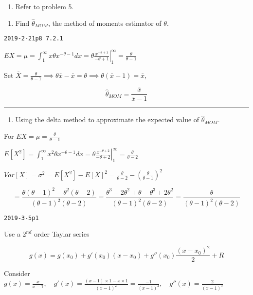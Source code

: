 \documentclass[12pt,]{article}
\providecommand{\tightlist}{%
  \setlength{\itemsep}{0pt}\setlength{\parskip}{0pt}}
\begin{document}
\begin{enumerate}
\def\labelenumi{\arabic{enumi}.}
\setcounter{enumi}{5}
\tightlist
\item
  \textcolor[rgb]{0.5,0.5,0.5}{Refer to problem 5.}
\end{enumerate}

\begin{enumerate}
\def\labelenumi{\alph{enumi}.}
\tightlist
\item
  \textcolor[rgb]{0.5,0.5,0.5}{Find $\hat\theta_{MOM}$, the method of moments estimator of $\theta$.}
\end{enumerate}

\texttt{2019-2-21p8\ 7.2.1}

\(EX=\mu=\int_1^{\infty}x\theta x^{-\theta-1}dx=\left.\theta\frac{x^{-\theta+1}}{-\theta+1}\right|_1^{\infty}=\frac\theta{\theta-1}\)

Set
\(\bar X=\frac\theta{\theta-1}\implies\theta\bar x-\bar x=\theta\implies\theta(\bar x-1)=\bar x\),

\[\hat\theta_{MOM}=\frac{\bar x}{\bar x-1}\]

\begin{center}\rule{0.5\linewidth}{\linethickness}\end{center}

\begin{enumerate}
\def\labelenumi{\alph{enumi}.}
\setcounter{enumi}{1}
\tightlist
\item
  \textcolor[rgb]{0.5,0.5,0.5}{Using the delta method to approximate the expected value of $\hat\theta_{MOM}$.}
\end{enumerate}

For \(EX=\mu=\frac\theta{\theta-1}\)

\(E[X^2]=\int_1^{\infty}x^2\theta x^{-\theta-1}dx=\left.\theta\frac{x^{-\theta+2}}{-\theta+2}\right|_1^{\infty}=\frac\theta{\theta-2}\)

\(Var[X]=\sigma^2=E[X^2]-E[X]^2=\frac\theta{\theta-2}-(\frac\theta{\theta-1})^2\)

\[=\frac{\theta(\theta-1)^2-\theta^2(\theta-2)}{(\theta-1)^2(\theta-2)}=\frac{\theta^3-2\theta^2+\theta-\theta^3+2\theta^2}{(\theta-1)^2(\theta-2)}=\frac{\theta}{(\theta-1)^2(\theta-2)}\]

\texttt{2019-3-5p1}

Use a \(2^{nd}\) order Taylar series

\[g(x)=g(x_0)+g'(x_0)(x-x_0)+g''(x_0)\frac{(x-x_0)^2}2+R\]

Consider
\(g(x)=\frac{x}{x-1},\quad g'(x)=\frac{(x-1)\times1-x\times1}{(x-1)^2}=\frac{-1}{(x-1)^2},\quad g''(x)=\frac{2}{(x-1)^3}\)
\end{document}
